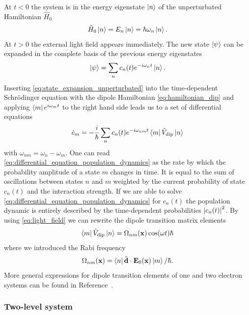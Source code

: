 At $t<0$ the system is in the energy eigenstate $\ket{n}$ of the
unperturbated Hamiltonian $\hat{H}_0$
\begin{equation}
  \hat{H}_0\ket{n}
  =E_n\ket{n}
  =\hbar\omega_n\ket{n}
  \label{eq:eigenvalue_energy_unperturbated}.
\end{equation}
At $t>0$ the external light field appears immediately. The new state
$\ket{\psi}$ can be expanded in the complete basis of the previous energy
eigenstates
\begin{equation}
  \ket{\psi}
  =
  \sum_n{c_n(t)}{e^{-i{\omega_n}t}}\ket{n}
  \label{eq:state_expansion_unperturbated}.
\end{equation}
Inserting \cref{eq:state_expansion_unperturbated} into the time-dependent
Schrödinger equation with the dipole Hamiltonian \cref{eq:hamiltonian_dip} and
applying $\bra{m}{e^{i{\omega_m}t}}$ to the right hand side leads us to a set
of differential equations
\begin{equation}
  \dot{c}_m
  =
  -\frac{i}{\hbar}\sum_n{c_n(t)}{e^{-i\omega_{nm}t}}
  \bra{m}\hat{V}_\text{dip}\ket{n}
  \label{eq:differential_equation_population_dynamics}
\end{equation}
with $\omega_{nm}=\omega_n-\omega_m$. One can read
\cref{eq:differential_equation_population_dynamics} as the rate by which
the probability amplitude of a state $m$ changes in time. It is equal to the
sum of oscillations between states $n$ and $m$ weighted by the current
probability of state $c_n(t)$ and the interaction strength. If we are able to
solve \cref{eq:differential_equation_population_dynamics} for $c_n(t)$ the
population dynamic is entirely described by the time-dependent probabilities
$\abs{c_n(t)}^2$. By using \cref{eq:light_field} we can rewrite the dipole
transition matrix elements
\begin{equation}
  \bra{m}\hat{V}_\text{dip}\ket{n}
  =\Omega_{nm}(\vb{x})\cos(\omega t)\hbar
  \label{eq:elements_dipole_transition_matrix}
\end{equation}
where we introduced the Rabi frequency
\begin{equation}
  \Omega_{nm}(\vb{x})
  =\bra{n}\hat{\vb{d}}\cdot\vb{E}_0(\vb{x})\ket{m}/\hbar
  \label{eq:rabi_frequency}.
\end{equation}
More general expressions for dipole transition elements of one and two
electron systems can be found in Reference~\cite{Bethe1957}. 

\subsubsection{Two-level system}


